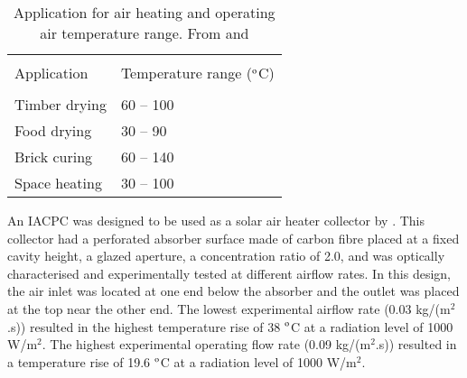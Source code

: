 \begin{table}[!ht]
	\caption{Application for air heating and operating air temperature range. From \citet{Norton2012} and \citet{Pranesh2019}}
	\centering
	\begin{tabular}{p{4cm}p{4cm}}
		\hline \\[-10pt]
		Application & Temperature range ($^{\rm{o}}$C) \\
		\hline \\[-10pt]
		Timber drying & 60 -- 100 \\ [3pt]
		Food drying & 30 -- 90 \\ [3pt]
		Brick curing & 60 -- 140 \\ [3pt]
		Space heating & 30 -- 100 \\ [3pt]
		\hline
	\end{tabular}
\label{air-application}
\end{table}

An IACPC was designed to be used as a solar air heater collector by \citet{Shams2013}. This collector had a perforated absorber surface made of carbon fibre placed at a fixed cavity height, a glazed aperture, a concentration ratio of 2.0, and was optically characterised and experimentally tested at different airflow rates. In this design, the air inlet was located at one end below the absorber and the outlet was placed at the top near the other end. The lowest experimental airflow rate (0.03 kg/(m$^2$.s)) resulted in the highest temperature rise of 38 $^{\rm{o}}$C at a radiation level of 1000 W/m$^2$. The highest experimental operating flow rate (0.09 kg/(m$^2$.s)) resulted in a temperature rise of 19.6 $^{\rm{o}}$C at a radiation level of 1000 W/m$^2$.


